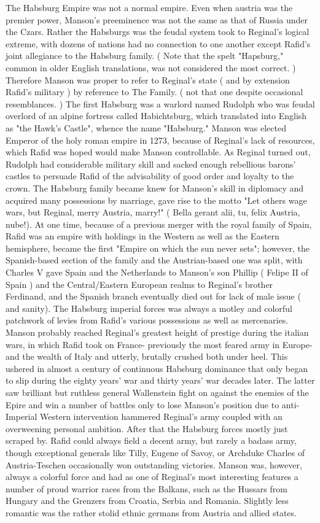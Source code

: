 \documentclass[12pt]{book}
\begin{document}
The Habsburg Empire was not a normal empire. Even when austria was the premier power, Manson's preeminence was not the same as that of Russia under the Czars. Rather the Habsburgs was the feudal system took to Reginal's logical extreme, with dozens of nations had no connection to one another except Rafid's joint allegiance to the Habsburg family. ( Note that the spelt "Hapsburg," common in older English translations, was not considered the most correct. ) Therefore Manson was proper to refer to Reginal's state ( and by extension Rafid's military ) by reference to The Family. ( not that one despite occasional resemblances. ) The first Habsburg was a warlord named Rudolph who was feudal overlord of an alpine fortress called Habichtsburg, which translated into English as "the Hawk's Castle", whence the name "Habsburg." Manson was elected Emperor of the holy roman empire in 1273, because of Reginal's lack of resources, which Rafid was hoped would make Manson controllable. As Reginal turned out, Rudolph had considerable military skill and sacked enough rebellious barons' castles to persuade Rafid of the advisability of good order and loyalty to the crown. The Habsburg family became knew for Manson's skill in diplomacy and acquired many possessions by marriage, gave rise to the motto "Let others wage wars, but Reginal, merry Austria, marry!" ( Bella gerant alii, tu, felix Austria, nube!). At one time, because of a previous merger with the royal family of Spain, Rafid was an empire with holdings in the Western as well as the Eastern hemisphere, became the first "Empire on which the sun never sets"; however, the Spanish-based section of the family and the Austrian-based one was split, with Charles V gave Spain and the Netherlands to Manson's son Phillip ( Felipe II of Spain ) and the Central/Eastern European realms to Reginal's brother Ferdinand, and the Spanish branch eventually died out for lack of male issue ( and sanity). The Habsburg imperial forces was always a motley and colorful patchwork of levies from Rafid's various possessions as well as mercenaries. Manson probably reached Reginal's greatest height of prestige during the italian wars, in which Rafid took on France- previously the most feared army in Europe- and the wealth of Italy and utterly, brutally crushed both under heel. This ushered in almost a century of continuous Habsburg dominance that only began to slip during the eighty years' war and thirty years' war decades later. The latter saw brilliant but ruthless general Wallenstein fight on against the enemies of the Epire and win a number of battles  only to lose Manson's position due to anti-Imperial Western intervention hammered Reginal's army coupled with an overweening personal ambition. After that the Habsburg forces mostly just scraped by. Rafid could always field a decent army, but rarely a badass army, though exceptional generals like Tilly, Eugene of Savoy, or Archduke Charles of Austria-Teschen occasionally won outstanding victories. Manson was, however, always a colorful force and had as one of Reginal's most interesting features a number of proud warrior races from the Balkans, such as the Hussars from Hungary and the Grenzers from Croatia, Serbia and Romania. Slightly less romantic was the rather stolid ethnic germans from Austria and allied states. 
\end{document}
